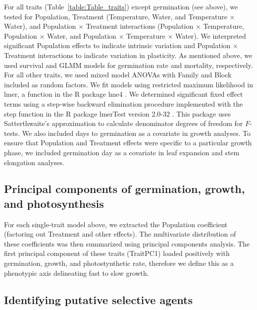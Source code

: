\documentclass[11pt, oneside]{article}
\newcommand{\pkg}[1]{{\fontseries{b}\selectfont #1}}
\begin{document}
For all traits (Table~\ref{table:Table_traits}) except germination (see above), we tested for Population, Treatment (Temperature, Water, and Temperature $\times$ Water), and Population $\times$ Treatment interactions (Population $\times$ Temperature, Population $\times$ Water, and Population $\times$ Temperature $\times$ Water). We interpreted significant Population effects to indicate intrinsic variation and Population $\times$ Treatment interactions to indicate variation in plasticity. As mentioned above, we used survival and GLMM models for germination rate and mortality, respectively. For all other traits, we used mixed model ANOVAs with Family and Block included as random factors. We fit models using restricted maximum likelihood in lmer, a function in the R package \pkg{lme4} \citep{Bates_etal_2015}. We determined significant fixed effect terms using a step-wise backward elimination procedure implemented with the step function in the R package \pkg{lmerTest} version 2.0-32 \citep{Kuznetsova_etal_2016}. This package uses Satterthwaite's approximation to calculate denominator degrees of freedom for $F$-tests. We also included days to germination as a covariate in growth analyses. To ensure that Population and Treatment effects were specific to a particular growth phase, we included germination day as a covariate in leaf expansion and stem elongation analyses.

\subsection*{Principal components of germination, growth, and photosynthesis}
For each single-trait model above, we extracted the Population coefficient (factoring out Treatment and other effects). The multivariate distribution of these coefficients was then summarized using principal components analysis. The first principal component of these traits (TraitPC1) loaded positively with germination, growth, and photostynthetic rate, therefore we define this as a phenotypic axis delineating fast to slow growth.



\subsection*{Identifying putative selective agents}
\end{document}
